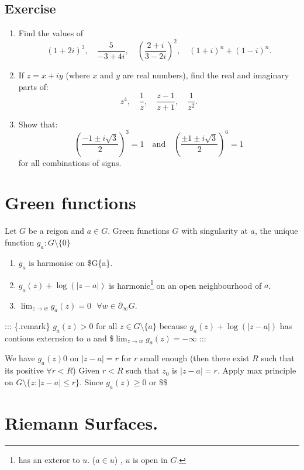 \documentclass[
]{book}
\providecommand{\tightlist}{%
  \setlength{\itemsep}{0pt}\setlength{\parskip}{0pt}}
\theoremstyle{definition}
\theoremstyle{definition}
\theoremstyle{definition}
\theoremstyle{definition}
\theoremstyle{remark}
\begin{document}
\section{Exercise}\label{exercise}

\begin{enumerate}
\def\labelenumi{\arabic{enumi}.}
\item
  Find the values of
  \[    (1 + 2i)^3, \quad \frac{5}{-3 + 4i}, \quad \left( \frac{2 + i}{3 - 2i} \right)^2, \quad (1 + i)^n + (1 - i)^n.\]
\item
  If \(z = x + iy\) (where \(x\) and \(y\) are real numbers), find the real and imaginary parts of:
  \[z^4, \quad \frac{1}{z}, \quad \frac{z - 1}{z + 1}, \quad \frac{1}{z^2}.\]
\item
  Show that:
  \[  \left( \frac{-1 \pm i\sqrt{3}}{2} \right)^3 = 1 \quad \text{and} \quad \left( \frac{\pm 1 \pm i\sqrt{3}}{2} \right)^6 = 1\]
  for all combinations of signs.
\end{enumerate}

\chapter{Green functions}\label{green-functions}

Let \(G\) be a reigon and \(a\in G\). Green functions \(G\) with singularity at \(a\), the unique function \(g_a:G\setminus \{0\}\)

\begin{enumerate}
\def\labelenumi{\arabic{enumi}.}
\tightlist
\item
  \(g_a\) is harmonisc on \$G\setminus\{a\}.
\item
  \(g_a(z)+\log(|z-a|)\) is harmonic\footnote{has an exteror to \(u\). (\(a\in u\)) , \(u\) is open in \(G\).} on an open neighbourhood of \(a\).
\item
  \(\lim_{z\to w}g_a(z)=0 ~~~\forall w \in \partial_\infty G\).
\end{enumerate}

::: \{.remark\}
\(g_a(z)>0\) for all \(z \in G\setminus \{a\}\) because \(g_a(z)+\log(|z-a|)\) has contious externsion to \(u\) and \$\(\lim_{z\to w}g_a(z)=-\infty\)
:::

We have \(g_a(z)0\) on \(|z-a|=r\) for \(r\) small enough (then there exist \(R\) such that its positive \(\forall r<R\)) Given \(r<R\) such that \(z_0\) is \(|z-a|=r\). Apply max principle on \(G\setminus\{z:|z-a|\leq r\}\). Since \(g_a(z)\geq 0\) or \$\$

\chapter{Riemann Surfaces.}\label{riemann-surfaces.}
\end{document}
